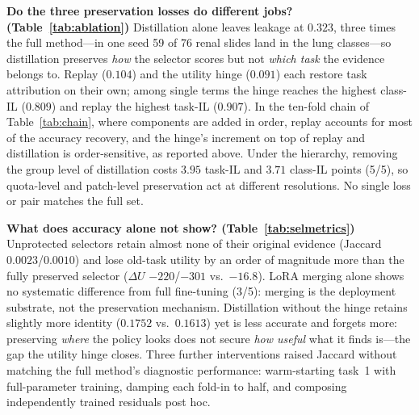 \documentclass{article}
\begin{document}
\textbf{Do the three preservation losses do different jobs? (Table~\ref{tab:ablation})}
Distillation alone leaves leakage at $0.323$, three times the full method---in one seed 59 of 76 renal slides land in the lung classes---so distillation preserves \emph{how} the selector scores but not \emph{which task} the evidence belongs to. Replay ($0.104$) and the utility hinge ($0.091$) each restore task attribution on their own; among single terms the hinge reaches the highest class-IL ($0.809$) and replay the highest task-IL ($0.907$). In the ten-fold chain of Table~\ref{tab:chain}, where components are added in order, replay accounts for most of the accuracy recovery, and the hinge's increment on top of replay and distillation is order-sensitive, as reported above. Under the hierarchy, removing the group level of distillation costs $3.95$ task-IL and $3.71$ class-IL points (5/5), so quota-level and patch-level preservation act at different resolutions. No single loss or pair matches the full set.

\begin{table}[t]
\centering\footnotesize
\caption{\textbf{Selection-level metrics under the ablation protocol} (flat, fold 1, mean over 5 seeds): what accuracy alone cannot show.}
\label{tab:selmetrics}
\end{table}

\textbf{What does accuracy alone not show? (Table~\ref{tab:selmetrics})}
Unprotected selectors retain almost none of their original evidence (Jaccard $0.0023$/$0.0010$) and lose old-task utility by an order of magnitude more than the fully preserved selector ($\Delta U$ $-220$/$-301$ vs.\ $-16.8$). LoRA merging alone shows no systematic difference from full fine-tuning (3/5): merging is the deployment substrate, not the preservation mechanism. Distillation without the hinge retains slightly more identity ($0.1752$ vs.\ $0.1613$) yet is less accurate and forgets more: preserving \emph{where} the policy looks does not secure \emph{how useful} what it finds is---the gap the utility hinge closes. Three further interventions raised Jaccard without matching the full method's diagnostic performance: warm-starting task~1 with full-parameter training, damping each fold-in to half, and composing independently trained residuals post hoc.
\end{document}
